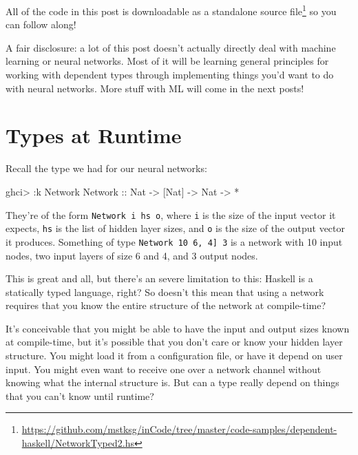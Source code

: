 \documentclass[]{article}
\newenvironment{Shaded}{\begin{snugshade}}{\end{snugshade}}
\newcommand{\DataTypeTok}[1]{\textcolor[rgb]{0.13,0.29,0.53}{#1}}
\newcommand{\FunctionTok}[1]{\textcolor[rgb]{0.00,0.00,0.00}{#1}}
\newcommand{\NormalTok}[1]{#1}
\newcommand{\OtherTok}[1]{\textcolor[rgb]{0.56,0.35,0.01}{#1}}
\renewcommand{\href}[2]{#2\footnote{\url{#1}}}
\begin{document}
All of the code in this post is
\href{https://github.com/mstksg/inCode/tree/master/code-samples/dependent-haskell/NetworkTyped2.hs}{downloadable
as a standalone source file} so you can follow along!

A fair disclosure: a lot of this post doesn't actually directly deal with
machine learning or neural networks. Most of it will be learning general
principles for working with dependent types through implementing things you'd
want to do with neural networks. More stuff with ML will come in the next posts!

\hypertarget{types-at-runtime}{%
\section{Types at Runtime}\label{types-at-runtime}}

Recall the type we had for our neural networks:

\begin{Shaded}
\begin{Highlighting}[]
\NormalTok{ghci}\FunctionTok{>} \FunctionTok{:}\NormalTok{k }\DataTypeTok{Network}
\DataTypeTok{Network}\OtherTok{ ::} \DataTypeTok{Nat} \OtherTok{->}\NormalTok{ [}\DataTypeTok{Nat}\NormalTok{] }\OtherTok{->} \DataTypeTok{Nat} \OtherTok{->} \FunctionTok{*}
\end{Highlighting}
\end{Shaded}

They're of the form \texttt{Network\ i\ hs\ o}, where \texttt{i} is the size of
the input vector it expects, \texttt{hs} is the list of hidden layer sizes, and
\texttt{o} is the size of the output vector it produces. Something of type
\texttt{Network\ 10\ \textquotesingle{}{[}6,\ 4{]}\ 3} is a network with 10
input nodes, two input layers of size 6 and 4, and 3 output nodes.

This is great and all, but there's an severe limitation to this: Haskell is a
statically typed language, right? So doesn't this mean that using a network
requires that you know the entire structure of the network at compile-time?

It's conceivable that you might be able to have the input and output sizes known
at compile-time, but it's possible that you don't care or know your hidden layer
structure. You might load it from a configuration file, or have it depend on
user input. You might even want to receive one over a network channel without
knowing what the internal structure is. But can a type really depend on things
that you can't know until runtime?
\end{document}
